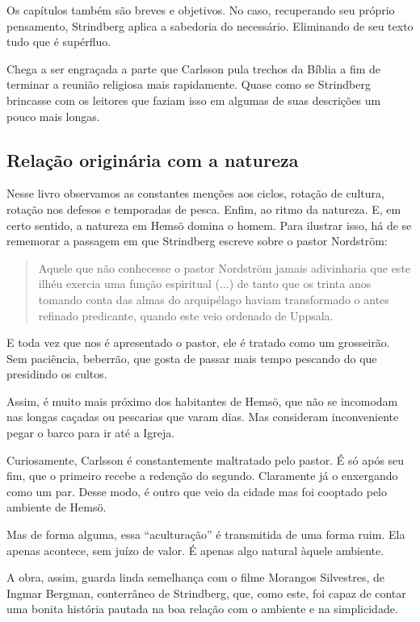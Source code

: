 \documentclass[12pt]{extarticle}
\begin{document}
Os capítulos também são breves e objetivos. No caso, recuperando seu
próprio pensamento, Strindberg aplica a sabedoria do necessário.
Eliminando de seu texto tudo que é supérfluo.

Chega a ser engraçada a parte que Carlsson pula trechos da Bíblia a fim
de terminar a reunião religiosa mais rapidamente. Quase como se
Strindberg brincasse com os leitores que faziam isso em algumas de suas
descrições um pouco mais longas.

\subsection{Relação originária com a natureza}

Nesse livro observamos as constantes menções aos ciclos, rotação de
cultura, rotação nos defesos e temporadas de pesca. Enfim, ao ritmo da
natureza. E, em certo sentido, a natureza em Hemsö domina o homem. Para
ilustrar isso, há de se rememorar a passagem em que Strindberg escreve
sobre o pastor Nordström:

\begin{quote}
Aquele que não conhecesse o pastor Nordström jamais adivinharia que este
ilhéu exercia uma função espiritual (...) de tanto que os trinta anos
tomando conta das almas do arquipélago haviam transformado o antes
refinado predicante, quando este veio ordenado de Uppsala.
\end{quote}

E toda vez que nos é apresentado o pastor, ele é tratado como um
grosseirão. Sem paciência, beberrão, que gosta de passar mais tempo
pescando do que presidindo os cultos.

Assim, é muito mais próximo dos habitantes de Hemsö, que não se
incomodam nas longas caçadas ou pescarias que varam dias. Mas consideram
inconveniente pegar o barco para ir até a Igreja.

Curiosamente, Carlsson é constantemente maltratado pelo pastor. É só
após seu fim, que o primeiro recebe a redenção do segundo. Claramente já
o enxergando como um par. Desse modo, é outro que veio da cidade mas foi
cooptado pelo ambiente de Hemsö.

Mas de forma alguma, essa ``aculturação'' é transmitida de uma forma
ruim. Ela apenas acontece, sem juízo de valor. É apenas algo natural
àquele ambiente.

A obra, assim, guarda linda semelhança com o filme Morangos Silvestres,
de Ingmar Bergman, conterrâneo de Strindberg, que, como este, foi capaz
de contar uma bonita história pautada na boa relação com o ambiente e na
simplicidade.
\end{document}
